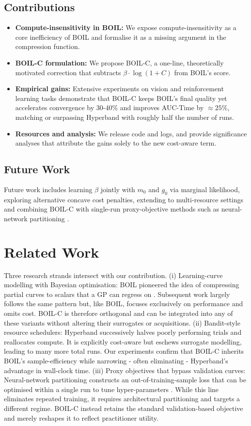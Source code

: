 \documentclass{article} %
\begin{document}
\subsection{Contributions}
\begin{itemize}
  \item \textbf{Compute-insensitivity in BOIL:} We expose compute-insensitivity as a core inefficiency of BOIL and formalise it as a missing argument in the compression function.
  \item \textbf{BOIL-C formulation:} We propose BOIL-C, a one-line, theoretically motivated correction that subtracts \(\beta\cdot\log(1+C)\) from BOIL’s score.
  \item \textbf{Empirical gains:} Extensive experiments on vision and reinforcement learning tasks demonstrate that BOIL-C keeps BOIL’s final quality yet accelerates convergence by 30-40\% and improves AUC-Time by \(\approx 25\%\), matching or surpassing Hyperband with roughly half the number of runs.
  \item \textbf{Resources and analysis:} We release code and logs, and provide significance analyses that attribute the gains solely to the new cost-aware term.
\end{itemize}

\subsection{Future Work}
Future work includes learning \(\beta\) jointly with \(m_0\) and \(g_0\) via marginal likelihood, exploring alternative concave cost penalties, extending to multi-resource settings and combining BOIL-C with single-run proxy-objective methods such as neural-network partitioning \cite{mlodozeniec-2023-hyperparameter}.

\section{Related Work}
\label{sec:related}
Three research strands intersect with our contribution. (i) Learning-curve modelling with Bayesian optimisation: BOIL pioneered the idea of compressing partial curves to scalars that a GP can regress on \cite{nguyen-2019-bayesian}. Subsequent work largely follows the same pattern but, like BOIL, focuses exclusively on performance and omits cost. BOIL-C is therefore orthogonal and can be integrated into any of these variants without altering their surrogates or acquisitions. (ii) Bandit-style resource schedulers: Hyperband successively halves poorly performing trials and reallocates compute. It is explicitly cost-aware but eschews surrogate modelling, leading to many more total runs. Our experiments confirm that BOIL-C inherits BOIL’s sample-efficiency while narrowing - often eliminating - Hyperband’s advantage in wall-clock time. (iii) Proxy objectives that bypass validation curves: Neural-network partitioning constructs an out-of-training-sample loss that can be optimised within a single run to tune hyper-parameters \cite{mlodozeniec-2023-hyperparameter}. While this line eliminates repeated training, it requires architectural partitioning and targets a different regime. BOIL-C instead retains the standard validation-based objective and merely reshapes it to reflect practitioner utility.
\end{document}
